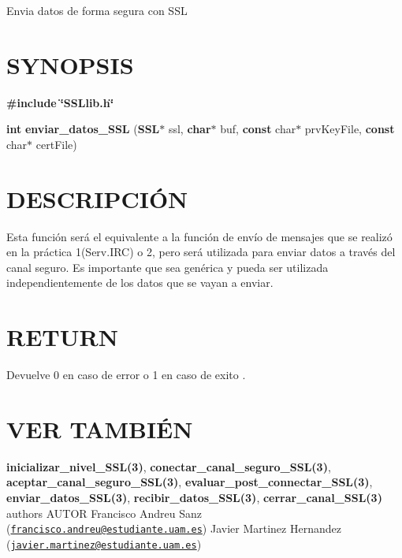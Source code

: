 Envia datos de forma segura con S\-S\-L\hypertarget{unknown_case_SYNOPSIS}{}\section{S\-Y\-N\-O\-P\-S\-I\-S}\label{unknown_case_SYNOPSIS}
{\bfseries \#include} {\bfseries \char`\"{}\-S\-S\-Llib.\-h\char`\"{}} 

{\bfseries int} {\bfseries enviar\-\_\-datos\-\_\-\-S\-S\-L} {\bfseries }({\bfseries S\-S\-L$\ast$} ssl, {\bfseries char$\ast$} buf, {\bfseries const} char$\ast$ prv\-Key\-File, {\bfseries const} char$\ast$ cert\-File{\bfseries })\hypertarget{unknown_case_descripcion}{}\section{D\-E\-S\-C\-R\-I\-P\-C\-IÓ\-N}\label{unknown_case_descripcion}
Esta función será el equivalente a la función de envío de mensajes que se realizó en la práctica 1(Serv.\-I\-R\-C) o 2, pero será utilizada para enviar datos a través del canal seguro. Es importante que sea genérica y pueda ser utilizada independientemente de los datos que se vayan a enviar.\hypertarget{cerrar_canal_SSL_return}{}\section{R\-E\-T\-U\-R\-N}\label{cerrar_canal_SSL_return}
Devuelve 0 en caso de error o 1 en caso de exito .\hypertarget{unknown_case_seealso}{}\section{V\-E\-R T\-A\-M\-B\-IÉ\-N}\label{unknown_case_seealso}
{\bfseries inicializar\-\_\-nivel\-\_\-\-S\-S\-L(3)}, {\bfseries conectar\-\_\-canal\-\_\-seguro\-\_\-\-S\-S\-L(3)}, {\bfseries aceptar\-\_\-canal\-\_\-seguro\-\_\-\-S\-S\-L(3)}, {\bfseries evaluar\-\_\-post\-\_\-connectar\-\_\-\-S\-S\-L(3)}, {\bfseries enviar\-\_\-datos\-\_\-\-S\-S\-L(3)}, {\bfseries recibir\-\_\-datos\-\_\-\-S\-S\-L(3)}, {\bfseries cerrar\-\_\-canal\-\_\-\-S\-S\-L(3)} {\bfseries }  authors A\-U\-T\-O\-R Francisco Andreu Sanz (\href{mailto:francisco.andreu@estudiante.uam.es}{\tt francisco.\-andreu@estudiante.\-uam.\-es}) Javier Martinez Hernandez (\href{mailto:javier.martinez@estudiante.uam.es}{\tt javier.\-martinez@estudiante.\-uam.\-es}) 